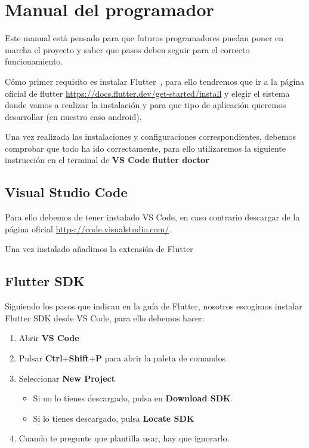 \section{Manual del programador}
Este manual está pensado para que futuros programadores puedan poner en marcha el proyecto y saber que pasos deben seguir para el correcto funcionamiento.

Cómo primer requisito es instalar Flutter~\cite{flutter}, para ello tendremos que ir a la página oficial de flutter \url{https://docs.flutter.dev/get-started/install} y elegir el sistema donde vamos a realizar la instalación y para que tipo de aplicación queremos desarrollar (en nuestro caso android).

Una vez realizada las instalaciones y configuraciones correspondientes, debemos comprobar que todo ha ido correctamente, para ello utilizaremos la siguiente instrucción en el terminal de \textbf{VS Code} \textbf{flutter doctor}

\subsection{Visual Studio Code}
Para ello debemos de tener instalado VS Code, en caso contrario descargar de la página oficial \url{https://code.visualstudio.com/}.

Una vez instalado añadimos la extensión de Flutter

\subsection{Flutter SDK}
Siguiendo los pasos que indican en la guía de Flutter, nosotros escogimos instalar Flutter SDK desde VS Code, para ello debemos hacer:
\begin{enumerate}
	\item Abrir \textbf{VS Code}
	\item Pulsar \textbf{Ctrl}+\textbf{Shift}+\textbf{P} para abrir la paleta de comandos
	\item Seleccionar \textbf{New Project}
		\begin{itemize}
			\item Si no lo tienes descargado, pulsa en \textbf{Download SDK}.
			\item Si lo tienes descargado, pulsa \textbf{Locate SDK}
		\end{itemize}
	\item Cuando te pregunte que plantilla usar, hay que ignorarlo.
\end{enumerate}

